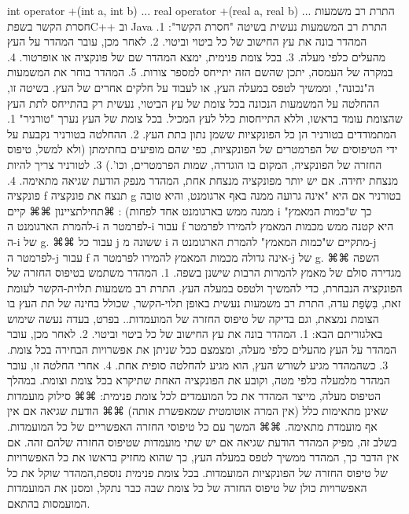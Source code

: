       int operator +(int a, int b) {...}
      real operator +(real a, real b) {...}
      התרת רב משמעות חסרת הקשר
      בשפתC++ וב Java התרת רב המשמעות נעשית בשיטה "חסרת הקשר":
      1. המהדר בונה את עץ החישוב של כל ביטוי וביטוי.
      2. לאחר מכן, עובר המהדר על העץ מהעלים כלפי מעלה.
      3. בכל צומת פנימית, ימצא המהדר שם של פונקציה או אופרטור.
      4. במקרה של העמסה, יתכן שהשם הזה יתייחס למספר צורות.
      5. המהדר בוחר את המשמעות ה"נכונה", וממשיך לטפס במעלה העץ, או לעבוד על חלקים אחרים של העץ.
      בשיטה זו, ההחלטה על המשמעות הנכונה בכל צומת של עץ הביטוי, נעשית רק בהתייחס לתת העץ שהצומת עומד בראשו, וללא התייחסות כלל לעץ המכיל. בכל צומת של העץ נערך "טורניר"
      1. המתמודדים בטורניר הן כל הפונקציות ששמן נתון בתת העץ.
      2. ההחלטה בטורניר נקבעת על ידי הטיפוסים של הפרמטרים של הפונקציות, כפי שהם מופיעים בחתימתן (ולא למשל, טיפוס החזרה של הפונקציה, המקום בו הוגדרה, שמות הפרמטרים, וכו'.)
      3. לטורניר צריך להיות מנצחת יחידה. אם יש יותר מפונקציה מנצחת אחת, המהדר מנפק הודעת שגיאה מתאימה.
      4. פונקציה f תנצח את פונקציה g בטורניר אם היא "אינה גרועה ממנה באף ארגומנט, והיא טובה ממנה ממש בארגומנט אחד לפחות) :
      ⌘תחילת{ציינון}
      ⌘⌘ קיים i כך ש"כמות המאמץ" להמרת הארגומנט ה-i לפרמטר ה-i עבור f היא קטנה ממש מכמות המאמץ להמירו לפרמטר ה-i של g.
      ⌘⌘ עבור כל j ששונה מ i מתקיים ש"כמות המאמץ" להמרת הארגומנט ה-j לפרמטר ה-j עבור f אינה גדולה מכמות המאמץ להמירו לפרמטר ה-j של g.
      ⌘⌘ השפה מגדירה סולם של מאמץ להמרות הרבות שישנן בשפה.
      1. המהדר משתמש בטיפוס החזרה של הפונקציה הנבחרת, כדי להמשיך ולטפס במעלה העץ.
      התרת רב משמעות תלוית-הקשר
      לעומת זאת, בִּשְׂפַת עדה, התרת רב משמעות נעשית באופן תלוי-הקשר, שכולל בחינה של תת העץ בו הצומת נמצאת, וגם בדיקה של טיפוס החזרה של המועמדות.. בפרט, בעדה נעשה שימוש באלגוריתם הבא:
      1. המהדר בונה את עץ החישוב של כל ביטוי וביטוי.
      2. לאחר מכן, עובר המהדר על העץ מהעלים כלפי מעלה, ומצמצם ככל שניתן את אפשרויות הבחירה בכל צומת.
      3. כשהמהדר מגיע לשורש העץ, הוא מגיע להחלטה סופית אחת.
      4. אחרי החלטה זו, עובר המהדר מלמעלה כלפי מטה, וקובע את הפונקציה האחת שתיקרא בכל צומת וצומת.
      במהלך הטיפוס מעלה, מייצר המהדר את כל המועמדים לכל צומת פנימית:
      ⌘⌘ סילוק מועמדות שאינן מתאימות כלל (אין המרה אוטומטית שמאפשרת אותה)
      ⌘⌘ הודעת שגיאה אם אין אף מועמדת מתאימה.
      ⌘⌘ המשך עם כל טיפוסי החזרה האפשריים של כל המועמדות.
      בשלב זה, מפיק המהדר הודעת שגיאה אם יש שתי מועמדות שטיפוס החזרה שלהם זהה. אם אין הדבר כך, המהדר ממשיך לטפס במעלה העץ, כך שהוא מחזיק בראשו את כל האפשרויות של טיפוס החזרה של הפונקציות המועמדות. בכל צומת פנימית נוספת,המהדר שוקל את כל האפשרויות כולן של טיפוס החזרה של כל צומת שבה כבר נתקל, ומסנן את המועמדות המועמסות בהתאם.
